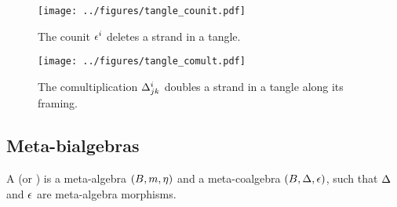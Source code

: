 \documentclass{beamer}
\begin{document}
\begin{frame}
        \begin{figure}
                \centering
                \texttt{[image: ../figures/tangle\_counit.pdf]}
                \caption{The counit $\epsilon^i$ deletes a strand in a tangle.}
                \label{fig:tangle_counit}
        \end{figure}
\end{frame}

\begin{frame}
        \begin{figure}
                \centering
                \texttt{[image: ../figures/tangle\_comult.pdf]}
                \caption{%
                        The comultiplication $\Delta^{i}_{jk}$ doubles a
                        strand in a tangle along its framing.%
                }
                \label{fig:tangle_comult}
        \end{figure}
\end{frame}

\subsection{Meta-bialgebras}

\begin{frame}
        \begin{definition}
                A  (or ) is a
                meta-algebra $(B,m,\eta)$ and a meta-coalgebra
                $(B,\Delta,\epsilon)$, such that $\Delta$ and $\epsilon$ are
                meta-algebra morphisms.
        \end{definition}
\end{frame}
\end{document}
